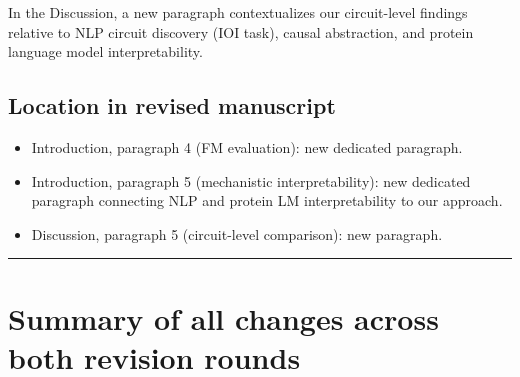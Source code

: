 \documentclass[11pt,letterpaper]{article}
\begin{document}
In the Discussion, a new paragraph contextualizes our circuit-level
findings relative to NLP circuit discovery (IOI task), causal
abstraction, and protein language model interpretability.

\subsection*{Location in revised manuscript}

\begin{itemize}[leftmargin=2em]
\item Introduction, paragraph 4 (FM evaluation): new dedicated paragraph.
\item Introduction, paragraph 5 (mechanistic interpretability): new
  dedicated paragraph connecting NLP and protein LM interpretability to
  our approach.
\item Discussion, paragraph 5 (circuit-level comparison): new paragraph.
\end{itemize}

\bigskip
\noindent\rule{\textwidth}{0.4pt}
\bigskip

\section*{Summary of all changes across both revision rounds}
\end{document}
